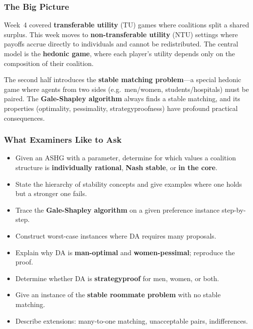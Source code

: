 \subsubsection*{The Big Picture}

Week~4 covered \textbf{transferable utility} (TU) games where coalitions split a shared surplus. This week moves to \textbf{non-transferable utility} (NTU) settings where payoffs accrue directly to individuals and cannot be redistributed. The central model is the \textbf{hedonic game}, where each player's utility depends only on the composition of their coalition.

The second half introduces the \textbf{stable matching problem}---a special hedonic game where agents from two sides (e.g.\ men/women, students/hospitals) must be paired. The \textbf{Gale-Shapley algorithm} always finds a stable matching, and its properties (optimality, pessimality, strategyproofness) have profound practical consequences.

\separator

\subsubsection*{What Examiners Like to Ask}

\begin{itemize}
  \item Given an ASHG with a parameter, determine for which values a coalition structure is \textbf{individually rational}, \textbf{Nash stable}, or \textbf{in the core}.
  \item State the hierarchy of stability concepts and give examples where one holds but a stronger one fails.
  \item Trace the \textbf{Gale-Shapley algorithm} on a given preference instance step-by-step.
  \item Construct worst-case instances where DA requires many proposals.
  \item Explain why DA is \textbf{man-optimal} and \textbf{women-pessimal}; reproduce the proof.
  \item Determine whether DA is \textbf{strategyproof} for men, women, or both.
  \item Give an instance of the \textbf{stable roommate problem} with no stable matching.
  \item Describe extensions: many-to-one matching, unacceptable pairs, indifferences.
\end{itemize}

\separator

